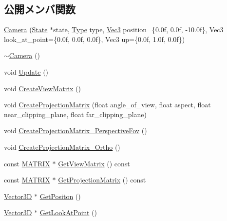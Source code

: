 \subsection*{公開メンバ関数}
\begin{DoxyCompactItemize}
\item 
\mbox{\hyperlink{class_camera_ab0a4101da05afaa3355df78e43006c33}{Camera}} (\mbox{\hyperlink{class_camera_1_1_state}{State}} $\ast$state, \mbox{\hyperlink{class_camera_a3b0a1f58deca679ac665f61c480d1dcb}{Type}} type, \mbox{\hyperlink{_vector3_d_8h_ab16f59e4393f29a01ec8b9bbbabbe65d}{Vec3}} position=\{0.\+0f, 0.\+0f, -\/10.\+0f\}, Vec3 look\+\_\+at\+\_\+point=\{0.\+0f, 0.\+0f, 0.\+0f\}, Vec3 up=\{0.\+0f, 1.\+0f, 0.\+0f\})
\item 
\mbox{\hyperlink{class_camera_ad1897942d0ccf91052386388a497349f}{$\sim$\+Camera}} ()
\item 
void \mbox{\hyperlink{class_camera_a4a596a3ea1fdc7d244ba4268031a360b}{Update}} ()
\item 
void \mbox{\hyperlink{class_camera_a5b4993ffb218536cb31d6d5224453b1a}{Create\+View\+Matrix}} ()
\item 
void \mbox{\hyperlink{class_camera_a3d34f1630680d8a8f719121c874a0830}{Create\+Projection\+Matrix}} (float angle\+\_\+of\+\_\+view, float aspect, float near\+\_\+clipping\+\_\+plane, float far\+\_\+clipping\+\_\+plane)
\item 
void \mbox{\hyperlink{class_camera_a1786fe1adbe95e2ffa2de4cdb114546a}{Create\+Projection\+Matrix\+\_\+\+Perspective\+Fov}} ()
\item 
void \mbox{\hyperlink{class_camera_a215010fc78cb35ed588ac9676c166f64}{Create\+Projection\+Matrix\+\_\+\+Ortho}} ()
\item 
const \mbox{\hyperlink{_vector3_d_8h_a032295cd9fb1b711757c90667278e744}{M\+A\+T\+R\+IX}} $\ast$ \mbox{\hyperlink{class_camera_aa472374f61480c5a9dff89d30be029f4}{Get\+View\+Matrix}} () const
\item 
const \mbox{\hyperlink{_vector3_d_8h_a032295cd9fb1b711757c90667278e744}{M\+A\+T\+R\+IX}} $\ast$ \mbox{\hyperlink{class_camera_a473a7a8408bc7a1fdd46d12fa3852846}{Get\+Projection\+Matrix}} () const
\item 
\mbox{\hyperlink{class_vector3_d}{Vector3D}} $\ast$ \mbox{\hyperlink{class_camera_a18f380bd6b2c42162c8fcf7e4441a355}{Get\+Positon}} ()
\item 
\mbox{\hyperlink{class_vector3_d}{Vector3D}} $\ast$ \mbox{\hyperlink{class_camera_a4cc3e87e6522b4a1ae72eab5b87430a6}{Get\+Look\+At\+Point}} ()
\item 

\end{DoxyCompactItemize}
